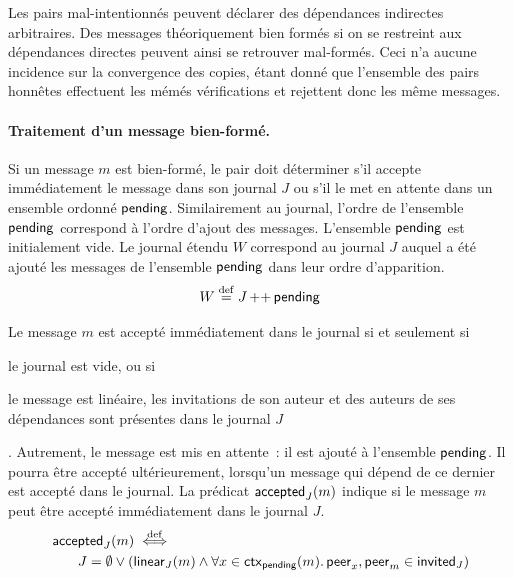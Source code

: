 \begin{remark}
Les pairs mal-intentionnés peuvent déclarer des dépendances indirectes arbitraires.
Des messages théoriquement bien formés si on se restreint aux dépendances directes peuvent ainsi se retrouver mal-formés.
Ceci n'a aucune incidence sur la convergence des copies, étant donné que l'ensemble des pairs honnêtes effectuent les mémés vérifications et rejettent donc les même messages.
\end{remark}


\paragraph{Traitement d'un message bien-formé.} Si un message $m$ est bien-formé, le pair doit déterminer s'il accepte immédiatement le message dans son journal $J$ ou s'il le met en attente dans un ensemble ordonné $\operatorname{\mathsf{pending}}$.
Similairement au journal, l'ordre de l'ensemble $\operatorname{\mathsf{pending}}$ correspond à l'ordre d'ajout des messages.
L'ensemble $\operatorname{\mathsf{pending}}$ est initialement vide.
Le journal étendu $W$ correspond au journal $J$ auquel a été ajouté les messages de l'ensemble $\operatorname{\mathsf{pending}}$ dans leur ordre d'apparition.
%
\begin{equation*}
    W \overset{\mathrm{def}}{=} J \operatorname{++} \operatorname{\mathsf{pending}}
\end{equation*}

Le message $m$ est accepté immédiatement dans le journal si et seulement si \begin{inlinelist}\item le journal est vide, ou si \item le message est linéaire, les invitations de son auteur et des auteurs de ses dépendances sont présentes dans le journal $J$\end{inlinelist}.
Autrement, le message est mis en attente~: il est ajouté à l'ensemble $\operatorname{\mathsf{pending}}$.
Il pourra être accepté ultérieurement, lorsqu'un message qui dépend de ce dernier est accepté dans le journal.
La prédicat $\operatorname{\mathsf{accepted}}_J(m)$ indique si le message $m$ peut être accepté immédiatement dans le journal $J$.
%
\begin{equation}\begin{split}
    \MoveEqLeft\trm{accepted}_J(m) \defiff\\
    &J = \emptyset \lor (\trm{linear}_J(m) \land \forall x \in \trm{ctx}_{\trm{pending}}(m) \qsep \trm{peer}_x, \trm{peer}_m \in \trm{invited}_J)
\end{split}\end{equation}

